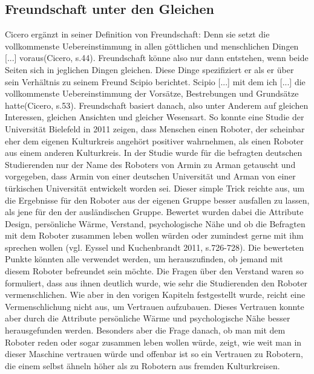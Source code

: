\documentclass[12pt]{article}
\begin{document}
\subsection{Freundschaft unter den Gleichen}
Cicero ergänzt in seiner Definition von Freundschaft: \glqq Denn sie setzt die vollkommenste Uebereinstimmung in allen göttlichen und menschlichen Dingen [...] voraus\grqq (Cicero, s.44). Freundschaft könne also nur dann entstehen, wenn beide Seiten sich in jeglichen Dingen gleichen. Diese Dinge spezifiziert er als er über sein Verhältnis zu seinem Freund Scipio berichtet. \glqq Scipio [...] mit dem ich [...] die vollkommenste Uebereinstimmung der Vorsätze, Bestrebungen und Grundsätze hatte\grqq(Cicero, s.53). Freundschaft basiert danach, also unter Anderem auf gleichen Interessen, gleichen Ansichten und gleicher Wesensart.
So konnte eine Studie der Universität Bielefeld in 2011 zeigen, dass Menschen einen Roboter, der scheinbar eher dem eigenen Kulturkreis angehört positiver wahrnehmen, als einen Roboter aus einem anderen Kulturkreis. In der Studie wurde für die befragten deutschen Studierenden nur der Name des Roboters von Armin zu Arman getauscht und vorgegeben, dass Armin von einer deutschen Universität und Arman von einer türkischen Universität entwickelt worden sei. Dieser simple Trick reichte aus, um die Ergebnisse für den Roboter aus der eigenen Gruppe besser ausfallen zu lassen, als jene für den der ausländischen Gruppe. Bewertet wurden dabei die Attribute Design, persönliche Wärme, Verstand, psychologische Nähe und ob die Befragten mit dem Roboter zusammen leben wollen würden oder zumindest gerne mit ihm sprechen wollen (vgl. Eyssel und Kuchenbrandt 2011, s.726-728). Die bewerteten Punkte könnten alle verwendet werden, um herauszufinden, ob jemand mit diesem Roboter befreundet sein möchte. Die Fragen über den Verstand waren so formuliert, dass aus ihnen deutlich wurde,  wie sehr die Studierenden den Roboter vermenschlichen. Wie aber in den vorigen Kapiteln festgestellt wurde, reicht eine Vermenschlichung nicht aus, um Vertrauen aufzubauen. Dieses Vertrauen konnte aber durch die Attribute persönliche Wärme und psychologische Nähe besser herausgefunden werden. Besonders aber die Frage danach, ob man mit dem Roboter reden oder sogar zusammen leben wollen würde, zeigt, wie weit man in dieser Maschine vertrauen würde und offenbar ist so ein Vertrauen zu Robotern, die einem selbst ähneln höher als zu Robotern aus fremden Kulturkreisen.\newline
\end{document}
